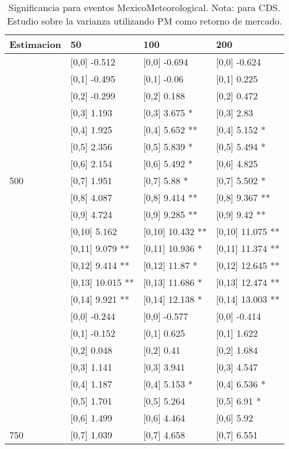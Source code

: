 \begin{table}

\caption{Significancia para eventos MexicoMeteorological. Nota: para CDS. Estudio sobre la varianza utilizando PM como retorno de mercado.}
\centering
\begin{tabular}[t]{llll}
\toprule
Estimacion & 50 & 100 & 200\\
\midrule
 & {}[0,0] -0.512 & {}[0,0] -0.694 & {}[0,0] -0.624\\
 & {}[0,1] -0.495 & {}[0,1] -0.06 & {}[0,1] 0.225\\
 & {}[0,2] -0.299 & {}[0,2] 0.188 & {}[0,2] 0.472\\
 & {}[0,3] 1.193 & {}[0,3] 3.675 * & {}[0,3] 2.83\\
 & {}[0,4] 1.925 & {}[0,4] 5.652 ** & {}[0,4] 5.152 *\\
\addlinespace
 & {}[0,5] 2.356 & {}[0,5] 5.839 * & {}[0,5] 5.494 *\\
 & {}[0,6] 2.154 & {}[0,6] 5.492 * & {}[0,6] 4.825\\
500 & {}[0,7] 1.951 & {}[0,7] 5.88 * & {}[0,7] 5.502 *\\
 & {}[0,8] 4.087 & {}[0,8] 9.414 ** & {}[0,8] 9.367 **\\
 & {}[0,9] 4.724 & {}[0,9] 9.285 ** & {}[0,9] 9.42 **\\
\addlinespace
 & {}[0,10] 5.162 & {}[0,10] 10.432 ** & {}[0,10] 11.075 **\\
 & {}[0,11] 9.079 ** & {}[0,11] 10.936 * & {}[0,11] 11.374 **\\
 & {}[0,12] 9.414 ** & {}[0,12] 11.87 * & {}[0,12] 12.645 **\\
 & {}[0,13] 10.015 ** & {}[0,13] 11.686 * & {}[0,13] 12.474 **\\
 & {}[0,14] 9.921 ** & {}[0,14] 12.138 * & {}[0,14] 13.003 **\\
\addlinespace
 & {}[0,0] -0.244 & {}[0,0] -0.577 & {}[0,0] -0.414\\
 & {}[0,1] -0.152 & {}[0,1] 0.625 & {}[0,1] 1.622\\
 & {}[0,2] 0.048 & {}[0,2] 0.41 & {}[0,2] 1.684\\
 & {}[0,3] 1.141 & {}[0,3] 3.941 & {}[0,3] 4.547\\
 & {}[0,4] 1.187 & {}[0,4] 5.153 * & {}[0,4] 6.536 *\\
\addlinespace
 & {}[0,5] 1.701 & {}[0,5] 5.264 & {}[0,5] 6.91 *\\
 & {}[0,6] 1.499 & {}[0,6] 4.464 & {}[0,6] 5.92\\
750 & {}[0,7] 1.039 & {}[0,7] 4.658 & {}[0,7] 6.551\\

\end{tabular}
\end{table}
